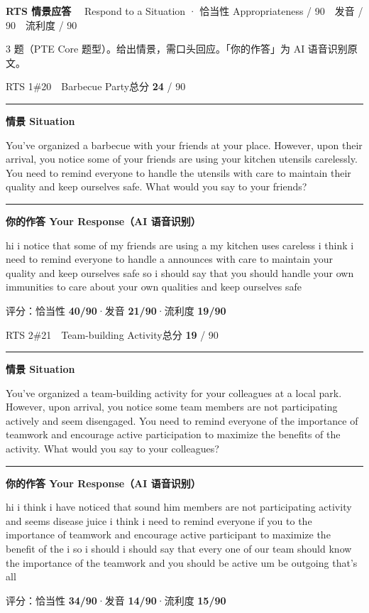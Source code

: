 \documentclass[11pt]{article}
\newcommand{\spart}[1]{\textcolor{cPartial}{\bfseries #1}} %
\newcommand{\szero}[1]{\textcolor{cWrong}{\bfseries #1}}   %
\newcommand{\ptesub}[1]{%
  \par\needspace{2\baselineskip}\smallskip
  {\color{cAccent}\rule[-0.2ex]{3pt}{1.05em}}\hspace{6pt}%
  {\bfseries\color{cHead}#1}\par\nopagebreak\smallskip}
\newcommand{\ptetask}[2]{%
  \needspace{4\baselineskip}\medskip
  \begin{tcolorbox}[enhanced, colback=cHead, colframe=cHead, sharp corners,
     left=12pt, right=12pt, top=5pt, bottom=5pt, boxrule=0pt]
    {\large\bfseries\color{white} #1}\ \ {\color{white!80} #2}
  \end{tcolorbox}\smallskip}
\begin{document}
\ptetask{RTS 情景应答}{Respond to a Situation · 恰当性 Appropriateness / 90　发音 / 90　流利度 / 90}

{\small\color{gray} 3 题（PTE Core 题型）。给出情景，需口头回应。「你的作答」为 AI 语音识别原文。}\smallskip

\begin{qblock}{RTS 1\quad \#20\ \ Barbecue Party}{总分 \textcolor{cAccent}{\bfseries 24} / 90}
\ptesub{情景 Situation}
\begin{promptbox}
You've organized a barbecue with your friends at your place. However, upon their arrival, you notice some of your friends are using your kitchen utensils carelessly. You need to remind everyone to handle the utensils with care to maintain their quality and keep ourselves safe. What would you say to your friends?
\end{promptbox}
\ptesub{你的作答 Your Response（AI 语音识别）}
\begin{youbox}
hi i notice that some of my friends are using a my kitchen uses careless i think i need to remind everyone to handle a announces with care to maintain your quality and keep ourselves safe so i should say that you should handle your own immunities to care about your own qualities and keep ourselves safe
\end{youbox}
{\small 评分：恰当性 \spart{40/90}\quad·\quad 发音 \szero{21/90}\quad·\quad 流利度 \szero{19/90}}
\end{qblock}

\begin{qblock}{RTS 2\quad \#21\ \ Team-building Activity}{总分 \textcolor{cAccent}{\bfseries 19} / 90}
\ptesub{情景 Situation}
\begin{promptbox}
You've organized a team-building activity for your colleagues at a local park. However, upon arrival, you notice some team members are not participating actively and seem disengaged. You need to remind everyone of the importance of teamwork and encourage active participation to maximize the benefits of the activity. What would you say to your colleagues?
\end{promptbox}
\ptesub{你的作答 Your Response（AI 语音识别）}
\begin{youbox}
hi i think i have noticed that sound him members are not participating activity and seems disease juice i think i need to remind everyone if you to the importance of teamwork and encourage active participant to maximize the benefit of the i so i should i should say that every one of our team should know the importance of the teamwork and you should be active um be outgoing that's all
\end{youbox}
{\small 评分：恰当性 \spart{34/90}\quad·\quad 发音 \szero{14/90}\quad·\quad 流利度 \szero{15/90}}
\end{qblock}
\end{document}
